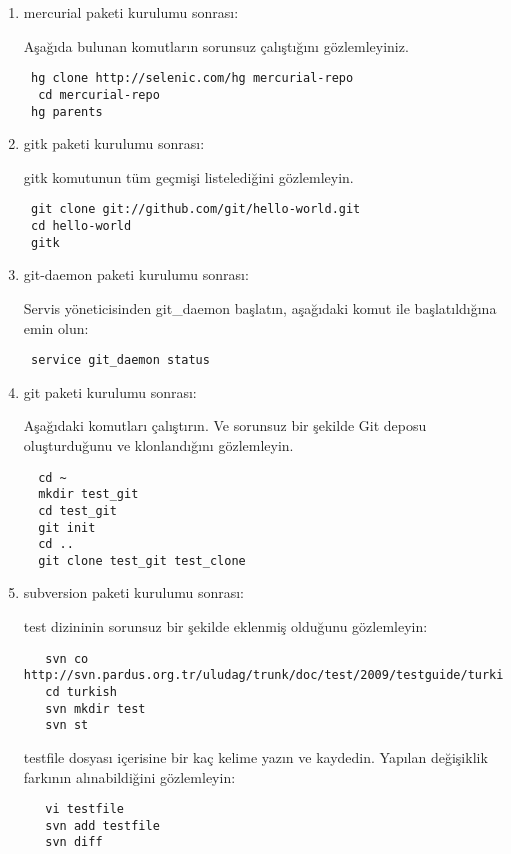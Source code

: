 \documentclass[a4paper,10pt]{article}
\begin{document}
\begin{enumerate}
\item mercurial paketi kurulumu sonrası:

Aşağıda bulunan komutların sorunsuz çalıştığını gözlemleyiniz.
\begin{verbatim}
 hg clone http://selenic.com/hg mercurial-repo
  cd mercurial-repo
 hg parents
\end{verbatim}


\item gitk paketi kurulumu sonrası:

gitk komutunun tüm geçmişi listelediğini gözlemleyin.
\begin{verbatim}
 git clone git://github.com/git/hello-world.git 
 cd hello-world
 gitk 
\end{verbatim}

\item git-daemon paketi kurulumu sonrası:

Servis yöneticisinden git\_daemon başlatın, aşağıdaki komut ile başlatıldığına emin olun:
\begin{verbatim}
 service git_daemon status
\end{verbatim}

\item git paketi kurulumu sonrası:

Aşağıdaki komutları çalıştırın. Ve sorunsuz bir şekilde Git deposu oluşturduğunu ve klonlandığını gözlemleyin.
\begin{verbatim}
  cd ~
  mkdir test_git
  cd test_git
  git init
  cd ..
  git clone test_git test_clone
\end{verbatim}

\item subversion paketi kurulumu sonrası:

test dizininin sorunsuz bir şekilde eklenmiş olduğunu gözlemleyin:
\begin{verbatim}
   svn co http://svn.pardus.org.tr/uludag/trunk/doc/test/2009/testguide/turkish/
   cd turkish
   svn mkdir test
   svn st
 \end{verbatim}
testfile dosyası içerisine bir kaç kelime yazın ve kaydedin. Yapılan değişiklik farkının alınabildiğini gözlemleyin:
\begin{verbatim}
   vi testfile
   svn add testfile
   svn diff
 \end{verbatim}
\end{enumerate}
\end{document}
